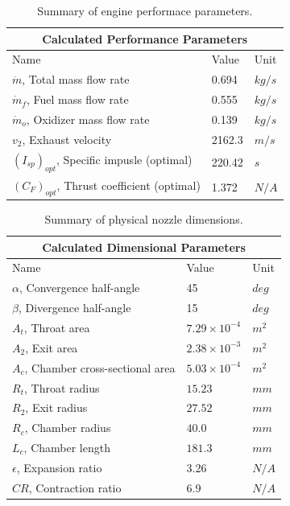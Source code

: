 \documentclass[9pt]{article} %
\numberwithin{equation}{section} %
\begin{document}
\begin{table}[!htb]
\centering
\begin{tabular}{ |p{6cm}||p{2cm}|p{1cm}| }
\hline
\multicolumn{3}{|c|}{Calculated Performance Parameters} \\
\hline
Name & Value & Unit \\ 
\hline
$\dot{m}$, Total mass flow rate  &  0.694  &  $kg/s$  \\
$\dot{m}_{f}$, Fuel mass flow rate &  0.555  &  $kg/s$  \\
$\dot{m}_{o}$, Oxidizer mass flow rate &  0.139  &  $kg/s$  \\
$v_{2}$, Exhaust velocity & 2162.3 & $m/s$ \\
$(I_{sp})_{opt}$, Specific impusle (optimal) & 220.42 & $s$ \\
$(C_{F})_{opt}$, Thrust coefficient (optimal) & 1.372 & $N/A$ \\
\hline
\end{tabular}
\caption{Summary of engine performace parameters.}
\label{table:calculated_parameters}
\end{table}

\begin{table}[!htb]
\centering
\begin{tabular}{ |p{6cm}||p{2cm}|p{1cm}| }
\hline
\multicolumn{3}{|c|}{Calculated Dimensional Parameters} \\
\hline
Name & Value & Unit \\ 
\hline
$\alpha$, Convergence half-angle &  45  &  $deg$ \\
$\beta$, Divergence half-angle &  15  &  $deg$  \\
$A_{t}$, Throat area  & $7.29 \times 10^{-4}$ & $m^{2}$ \\
$A_{2}$, Exit area & $2.38 \times 10^{-3}$ & $m^{2}$ \\
$A_{c}$, Chamber cross-sectional area & $5.03 \times 10^{-4}$ & $m^{2}$ \\
$R_{t}$, Throat radius & $15.23$ & $mm$ \\
$R_{2}$, Exit radius & $27.52$ & $mm$ \\
$R_{c}$, Chamber radius & $40.0$ & $mm$ \\
$L_{c}$, Chamber length & $181.3$ & $mm$ \\
$\epsilon$, Expansion ratio  &  3.26  &  $N/A$  \\
$CR$, Contraction ratio  &  6.9  &  $N/A$  \\
\hline
\end{tabular}
\caption{Summary of physical nozzle dimensions.}
\label{table:calculated_dimensions}
\end{table}
\end{document}
